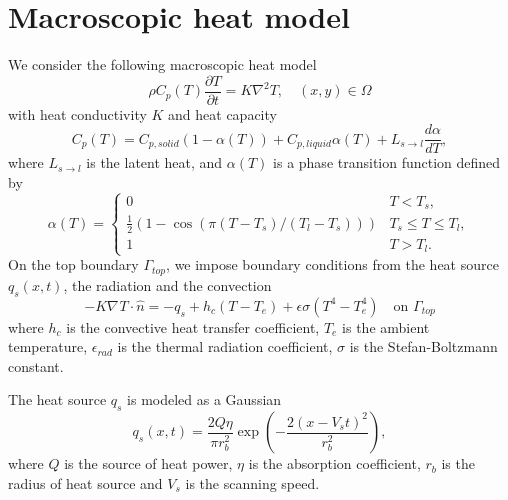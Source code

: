\documentclass[a4paper,12pt]{article}
\newcommand{\grad}[1]{\nabla_{#1}}
\begin{document}
\section{Macroscopic heat model}
We consider the following macroscopic heat model
\begin{equation}
\rho C_p(T) \frac{\partial T}{\partial t} = K \grad{}^2 T, \quad (x,y) \in \Omega
\end{equation}
with heat conductivity $K$ and heat capacity 
\begin{equation}
C_p(T) = C_{p,solid} ( 1-\alpha(T)) + C_{p,liquid} \alpha(T) + L_{s\rightarrow l} \frac{d \alpha}{ dT},
\end{equation}
where $L_{s\rightarrow l}$ is the latent heat, and $\alpha(T)$ is a phase transition function defined by
\begin{equation}
\alpha(T) = 
\left\{
\begin{array}{lr}
0 & T < T_s, \\
\frac{1}{2}( 1 - \cos(\pi (T-T_s)/ (T_l-T_s))) & T_s \leq T \leq T_l, \\
1 &  T > T_l.
\end{array}
\right.
\end{equation}
On the top boundary $\Gamma_{top}$, we impose boundary conditions from the heat source $q_s(x,t)$, the radiation  and the convection
\begin{equation}
-K \grad{} T \cdot \hat{n} = -q_s + h_c(T - T_e) + \epsilon \sigma (T^4 - T_e^4)   \quad \text{on } \Gamma_{top} 
\end{equation}
where $h_c$ is the convective heat transfer coefficient, $T_e$ is the ambient temperature, $\epsilon_{rad}$ is the thermal radiation coefficient, $\sigma$ is the Stefan-Boltzmann constant.

The heat source $q_s$ is modeled as a Gaussian
\begin{equation}
q_s(x, t ) = \frac{2Q\eta}{\pi r_b^2} \exp \left( -\frac{ 2(x-V_s t)^2}{ r_b^2} \right),
\end{equation}
where $Q$ is the source of heat power, $\eta$ is the absorption coefficient, $r_b$ is the radius of heat source and $V_s$ is the scanning speed.  



\end{document}
